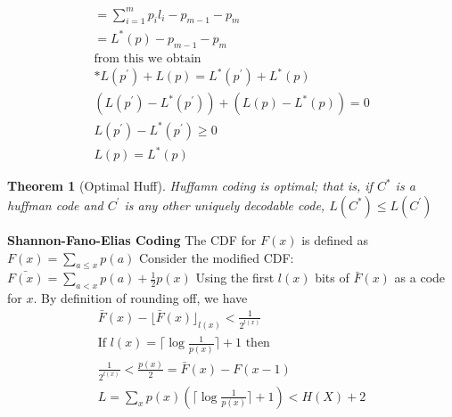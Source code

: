 \documentclass[10pt]{article}
\newtheorem{thm}{Theorem}[section]
\begin{document}
\begin{tiny}
\begin{multicols}{3}
\begin{eqnarray}
=\sum_{i=1}^{m} {p_i}{l_i} - {p_{m-1}} - {p_{m}}\\
=L^{*}(p) - {p_{m-1}} - {p_{m}}\\
\text{from this we obtain} \\*
L(p^{'}) + L(p) = L^{*}(p^{'}) + L^{*}(p)\\
(L(p^{'}) -  L^{*}(p^{'})) + (L(p) - L^{*}(p)) = 0\\
L(p^{'}) - L^{*}(p^{'}) \geq 0 \\
L(p) = L^{*}(p)
\end{eqnarray}
\begin{thm}[Optimal Huff] \label{thm: opthuff}
Huffamn coding is optimal; that is, if $C^{*}$ is a huffman code and $C^{'}$ is any other uniquely decodable code,
$L(C^{*}) \leq L(C^{'})$
\end{thm}


\textbf{\scriptsize Shannon-Fano-Elias Coding}
The CDF for ${F(x)}$ is defined as $F(x) = \sum_{a\leq x}p(a)$
Consider the modified CDF: $\bar{ F(x)} = \sum_{a < x}p(a) + \frac{1}{2} p(x)$
Using the first $l(x)$ bits of $\bar{F}(x)$ as a code for $x$. By definition of rounding off, we have 
\begin{eqnarray}
\bar{F}(x) - {\lfloor \bar{F}(x) \rfloor}_{l(x)} < \frac{1}{2^{l(x)}}\\
\text{If } l(x) = \lceil \log \frac{1}{p(x)} \rceil + 1 \text{ then } \\
\frac {1}{2^{l(x)}} < \frac {p(x)}{2} =  \bar{F}(x) - F(x-1)\\
L= \sum_x p(x) (\lceil \log \frac {1}{p(x)} \rceil + 1) < H(X) + 2
\end{eqnarray}


\end{multicols}
\end{tiny}
\end{document}
